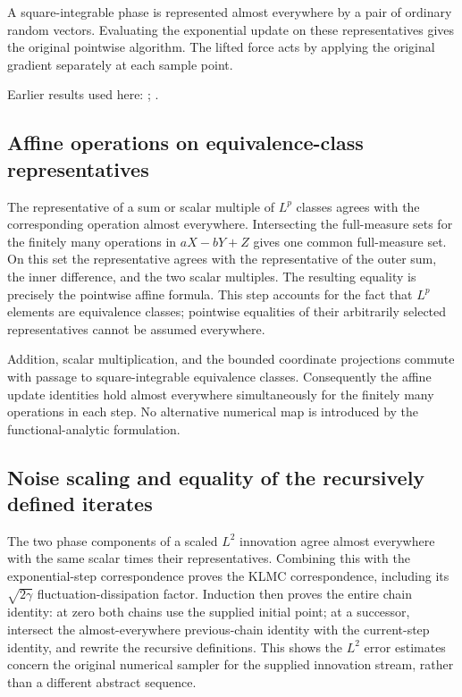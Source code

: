 \documentclass[11pt,a4paper]{report}
\begin{document}
A square-integrable phase is represented almost everywhere by a pair of ordinary random vectors. Evaluating the exponential update on these representatives gives the original pointwise algorithm. The lifted force acts by applying the original gradient separately at each sample point.



Earlier results used here: \cite[Section~3.13.2]{LangevinLean2026ULASC}; \cite[Section~3.13.3]{LangevinLean2026ULASC}.
\subsection{\texorpdfstring{Affine operations on equivalence-class representatives}{Affine operations on equivalence-class representatives}}
\label{report-step-KineticLangevin-LpDynamics-lean-2}


The representative of a sum or scalar multiple of \(L^p\) classes agrees with the corresponding operation almost everywhere. Intersecting the full-measure sets for the finitely many operations in \(aX-bY+Z\) gives one common full-measure set. On this set the representative agrees with the representative of the outer sum, the inner difference, and the two scalar multiples. The resulting equality is precisely the pointwise affine formula. This step accounts for the fact that \(L^p\) elements are equivalence classes; pointwise equalities of their arbitrarily selected representatives cannot be assumed everywhere.



Addition, scalar multiplication, and the bounded coordinate projections commute with passage to square-integrable equivalence classes. Consequently the affine update identities hold almost everywhere simultaneously for the finitely many operations in each step. No alternative numerical map is introduced by the functional-analytic formulation.

\subsection{\texorpdfstring{Noise scaling and equality of the recursively defined iterates}{Noise scaling and equality of the recursively defined iterates}}
\label{report-step-KineticLangevin-LpDynamics-lean-3}


The two phase components of a scaled \(L^{2}\) innovation agree almost everywhere with the same scalar times their representatives. Combining this with the exponential-step correspondence proves the KLMC correspondence, including its \(\sqrt{2\gamma}\) fluctuation-dissipation factor. Induction then proves the entire chain identity: at zero both chains use the supplied initial point; at a successor, intersect the almost-everywhere previous-chain identity with the current-step identity, and rewrite the recursive definitions. This shows the \(L^{2}\) error estimates concern the original numerical sampler for the supplied innovation stream, rather than a different abstract sequence.
\end{document}
